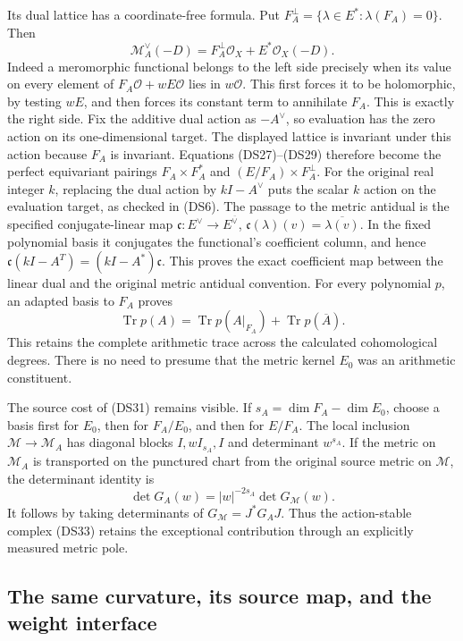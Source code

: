 \documentclass{article}
\begin{document}
Its dual lattice has a coordinate-free formula.  Put
$F_A^\perp=\{\lambda\in E^*: \lambda(F_A)=0\}$.  Then
\[
 \mathcal M_A^\vee(-D)=F_A^\perp\mathcal O_X+E^*\mathcal O_X(-D).
 \tag{DS34}
\]
Indeed a meromorphic functional belongs to the left side precisely
when its value on every element of $F_A\mathcal O+wE\mathcal O$
lies in $w\mathcal O$.  This first forces it to be holomorphic,
by testing $wE$, and then forces its constant term to annihilate
$F_A$.  This is exactly the right side.  Fix the additive dual
action as $-A^\vee$, so evaluation has the zero action on its
one-dimensional target.  The displayed lattice is invariant under
this action because $F_A$ is invariant.  Equations (DS27)--(DS29)
therefore become the perfect equivariant pairings
$F_A\times F_A^*$ and $(E/F_A)\times F_A^\perp$.
For the original real integer $k$, replacing the dual action by
$kI-A^\vee$ puts the scalar $k$ action on the evaluation target,
as checked in (DS6).  The passage to the metric antidual is the
specified conjugate-linear map
$\mathfrak c:E^\vee\to E^{\overline\vee}$,
$\mathfrak c(\lambda)(v)=\overline{\lambda(v)}$.
In the fixed polynomial basis it conjugates the functional's
coefficient column, and hence
$\mathfrak c(kI-A^T)=(kI-A^*)\mathfrak c$.
This proves the exact coefficient map between the linear dual and
the original metric antidual convention.
For every polynomial $p$, an adapted basis to $F_A$ proves
\[
 \operatorname{Tr}p(A)=
 \operatorname{Tr}p(A|_{F_A})+
 \operatorname{Tr}p(\overline A).
 \tag{DS35}
\]
This retains the complete arithmetic trace across the calculated
cohomological degrees.  There is no need to presume that the metric
kernel $E_0$ was an arithmetic constituent.

The source cost of (DS31) remains visible.  If
$s_A=\dim F_A-\dim E_0$, choose a basis first for $E_0$, then for
$F_A/E_0$, and then for $E/F_A$.  The local inclusion
$\mathcal M\to\mathcal M_A$ has diagonal blocks
$I,wI_{s_A},I$ and determinant $w^{s_A}$.  If the metric on
$\mathcal M_A$ is transported on the punctured chart from the
original source metric on $\mathcal M$, the determinant identity is
\[
 \det G_A(w)=|w|^{-2s_A}\det G_{\mathcal M}(w).
 \tag{DS36}
\]
It follows by taking determinants of $G_{\mathcal M}=J^*G_AJ$.
Thus the action-stable complex (DS33) retains the exceptional
contribution through an explicitly measured metric pole.

\subsection{The same curvature, its source map, and the weight interface}
\end{document}
